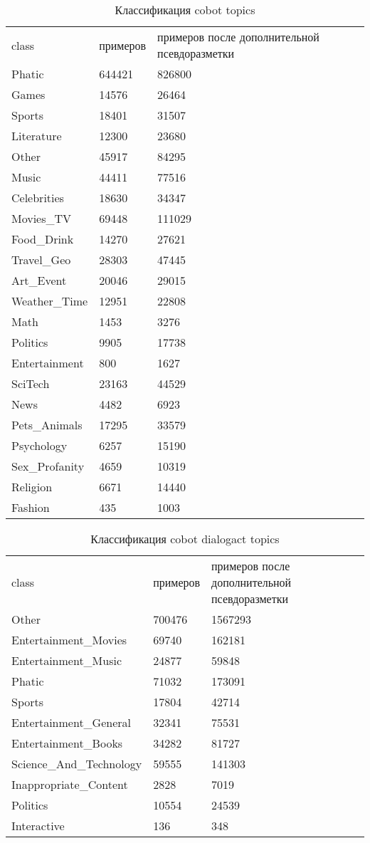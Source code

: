 \begin{table}[]
\caption{Классификация cobot topics}
\label{appendix:ct}
\begin{tabular}{lll}
class & примеров & примеров после дополнительной псевдоразметки \\
Phatic & 644421 & {826800} \\
Games & 14576 & {26464} \\
Sports & 18401 & {31507} \\
Literature & 12300 & 23680 \\
Other & 45917 & 84295 \\
Music & 44411 & 77516 \\
Celebrities & 18630 & 34347 \\
Movies\_TV & 69448 & 111029 \\
Food\_Drink & 14270 & 27621 \\
Travel\_Geo & 28303 & 47445 \\
Art\_Event & 20046 & 29015 \\
Weather\_Time & 12951 & 22808 \\
Math & 1453 & 3276 \\
Politics & 9905 & 17738 \\
Entertainment & 800 & 1627 \\
SciTech & 23163 & 44529 \\
News & 4482 & 6923 \\
Pets\_Animals & 17295 & 33579 \\
Psychology & 6257 & 15190 \\
Sex\_Profanity & 4659 & 10319 \\
Religion & 6671 & 14440 \\
Fashion & 435 & 1003
\end{tabular}
\end{table}


\begin{table}[]
\caption{Классификация cobot dialogact topics}
\label{appendix:dct}
\begin{tabular}{lll}
class & примеров & примеров после дополнительной псевдоразметки \\
Other & 700476 & {1567293} \\
Entertainment\_Movies & 69740 & {162181} \\
Entertainment\_Music & 24877 & {59848} \\
Phatic & 71032 & 173091 \\
Sports & 17804 & 42714 \\
Entertainment\_General & 32341 & 75531 \\
Entertainment\_Books & 34282 & 81727 \\
Science\_And\_Technology & 59555 & 141303 \\
Inappropriate\_Content & 2828 & 7019 \\
Politics & 10554 & 24539 \\
Interactive & 136 & 348
\end{tabular}
\end{table}


